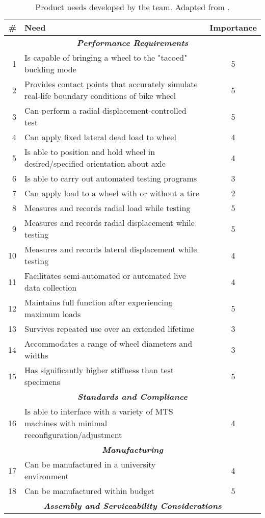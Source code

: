 \documentclass[\rootdir/thesis.tex]{subfiles}
\begin{document}
\begin{table}
\caption{Product needs developed by the team. Adapted from \cite{WheelCats2018}.}
\label{tab:wheelcats_needs}
\begin{tabularx}{\linewidth}{r|Xc}
\hline
\bf{\#}& \bf{Need}& \bf{Importance}\\
\hline
\multicolumn{3}{c}{\emph{\textbf{Performance Requirements}}}\\
\hline
1 & Is capable of bringing a wheel to the "tacoed" buckling mode& 5\\
2 & Provides contact points that accurately simulate real-life boundary conditions of bike wheel& 5\\
3 & Can perform a radial displacement-controlled test& 5\\
4 & Can apply fixed lateral dead load to wheel& 4\\
5 & Is able to position and hold wheel in desired/specified orientation about axle& 4\\
6 & Is able to carry out automated testing programs& 3\\
7 & Can apply load to a wheel with or without a tire& 2\\
8 & Measures and records radial load while testing& 5\\
9 & Measures and records radial displacement while testing& 5\\
10& Measures and records lateral displacement while testing& 4\\
11& Facilitates semi-automated or automated live data collection& 4\\
12& Maintains full function after experiencing maximum loads& 5\\
13& Survives repeated use over an extended lifetime& 3\\
14& Accommodates a range of wheel diameters and widths& 3\\
15& Has significantly higher stiffness than test specimens& 5\\
\hline
\multicolumn{3}{c}{\emph{\textbf{Standards and Compliance}}}\\
\hline
16& Is able to interface with a variety of MTS machines with minimal reconfiguration/adjustment& 4\\
\hline
\multicolumn{3}{c}{\emph{\textbf{Manufacturing}}}\\
\hline
17& Can be manufactured in a university environment& 4\\
18& Can be manufactured within budget& 5\\
\hline
\multicolumn{3}{c}{\emph{\textbf{Assembly and Serviceability Considerations}}}\\

\end{tabularx}
\end{table}
\end{document}
